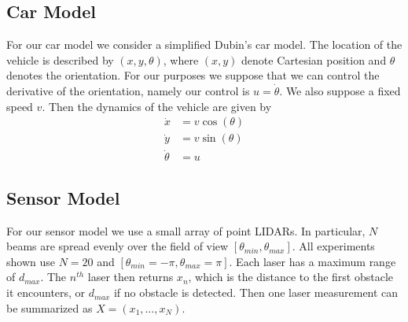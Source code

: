 \documentclass{article}
\begin{document}
\subsection{Car Model}

For our car model we consider a simplified Dubin's car model. The location of the vehicle is described by $(x,y,\theta)$, where $(x,y)$ denote Cartesian position and $\theta$ denotes the orientation. For our purposes we suppose that we can control the derivative of the orientation, namely our control is $u = \dot{\theta}$. We also suppose a fixed speed $v$. Then the dynamics of the vehicle are given by
%
%
%
\begin{align}
\dot{x} &= v \cos(\theta) \\ 
\dot{y} &= v \sin(\theta)\\ 
\dot{\theta} &= u
\end{align}
%
%
%

\subsection{Sensor Model}
For our sensor model we use a small array of point LIDARs. In particular, $N$ beams are spread evenly over the field of view $[\theta_{min},\theta_{max}]$.  All experiments shown use $N=20$ and $[\theta_{min}=-\pi,\theta_{max}=\pi]$.   Each laser has a maximum range of $d_{max}$. The $n^{th}$ laser then returns $x_n$, which is the distance to the first obstacle it encounters, or $d_{max}$ if no obstacle is detected. Then one laser measurement can be summarized as $X = (x_1,\ldots,x_N)$.
\end{document}
